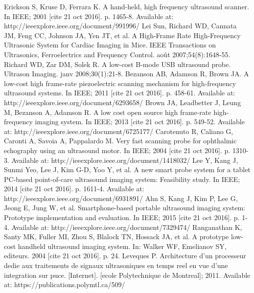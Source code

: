 \documentclass[letterpaper, 10 pt, conference]{ieeeconf} %
\begin{document}









\begin{thebibliography}{99}


 Erickson S, Kruse D, Ferrara K. A hand-held, high frequency ultrasound scanner. In IEEE; 2001 [cite 21 oct 2016]. p. 1465-8. Available at: http://ieeexplore.ieee.org/document/991996/
 Lei Sun, Richard WD, Cannata JM, Feng CC, Johnson JA, Yen JT, et al. A High-Frame Rate High-Frequency Ultrasonic System for Cardiac Imaging in Mice. IEEE Transactions on Ultrasonics, Ferroelectrics and Frequency Control. août 2007;54(8):1648-55. 
 Richard WD, Zar DM, Solek R. A low-cost B-mode USB ultrasound probe. Ultrason Imaging. janv 2008;30(1):21-8. 
 Bezanson AB, Adamson R, Brown JA. A low-cost high frame-rate piezoelectric scanning mechanism for high-frequency ultrasound systems. In IEEE; 2011 [cite 21 oct 2016]. p. 458-61. Available at: http://ieeexplore.ieee.org/document/6293658/
 Brown JA, Leadbetter J, Leung M, Bezanson A, Adamson R. A low cost open source high frame-rate high-frequency imaging system. In IEEE; 2013 [cite 21 oct 2016]. p. 549-52. Available at: http://ieeexplore.ieee.org/document/6725177/
 Carotenuto R, Caliano G, Caronti A, Savoia A, Pappalardo M. Very fast scanning probe for ophthalmic echography using an ultrasound motor. In IEEE; 2004 [cite 21 oct 2016]. p. 1310-3. Available at: http://ieeexplore.ieee.org/document/1418032/
 Lee Y, Kang J, Sunmi Yeo, Lee J, Kim G-D, Yoo Y, et al. A new smart probe system for a tablet PC-based point-of-care ultrasound imaging system: Feasibility study. In IEEE; 2014 [cite 21 oct 2016]. p. 1611-4. Available at: http://ieeexplore.ieee.org/document/6931891/
 Ahn S, Kang J, Kim P, Lee G, Jeong E, Jung W, et al. Smartphone-based portable ultrasound imaging system: Prototype implementation and evaluation. In IEEE; 2015 [cite 21 oct 2016]. p. 1-4. Available at: http://ieeexplore.ieee.org/document/7329474/
 Ranganathan K, Santy MK, Fuller MI, Zhou S, Blalock TN, Hossack JA, et al. A prototype low-cost handheld ultrasound imaging system. In: Walker WF, Emelianov SY, editeurs. 2004 [cite 21 oct 2016]. p. 24. 
 Leveques P. Architecture d’un processeur dedie aux traitements de signaux ultrasoniques en temps reel en vue d’une integration sur puce. [Internet]. [ecole Polytechnique de Montreal]; 2011. Available at: https://publications.polymtl.ca/509/

\end{thebibliography}
\end{document}
